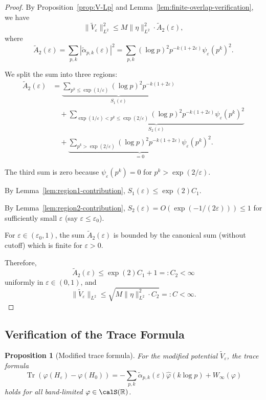 ﻿\documentclass[12pt,a4paper]{article}
\newtheorem{proposition}[theorem]{Proposition}
\theoremstyle{definition}
\theoremstyle{remark}
\newcommand{\RR}{\mathbb{R}}
\newcommand{\Tr}{\operatorname{Tr}}
\begin{document}
\begin{proof}
By Proposition~\ref{prop:V-Lp} and Lemma~\ref{lem:finite-overlap-verification}, we have
\[
  \|\widetilde{V}_\varepsilon\|_{L^2}^2 \leq M \|\eta\|_{L^2}^2 \cdot \widetilde{A}_2(\varepsilon),
\]
where
\[
  \widetilde{A}_2(\varepsilon) = \sum_{p,k} |\widetilde{\alpha}_{p,k}(\varepsilon)|^2 = \sum_{p,k} (\log p)^2 p^{-k(1+2\varepsilon)} \psi_\varepsilon(p^k)^2.
\]

We split the sum into three regions:
\begin{align*}
\widetilde{A}_2(\varepsilon) &= \underbrace{\sum_{p^k \leq \exp(1/\varepsilon)} (\log p)^2 p^{-k(1+2\varepsilon)}}_{S_1(\varepsilon)} \\
&\quad + \underbrace{\sum_{\exp(1/\varepsilon) < p^k \leq \exp(2/\varepsilon)} (\log p)^2 p^{-k(1+2\varepsilon)} \psi_\varepsilon(p^k)^2}_{S_2(\varepsilon)} \\
&\quad + \underbrace{\sum_{p^k > \exp(2/\varepsilon)} (\log p)^2 p^{-k(1+2\varepsilon)} \psi_\varepsilon(p^k)^2}_{=0}.
\end{align*}

The third sum is zero because $\psi_\varepsilon(p^k) = 0$ for $p^k > \exp(2/\varepsilon)$.

By Lemma~\ref{lem:region1-contribution}, $S_1(\varepsilon) \leq \exp(2) C_1$.

By Lemma~\ref{lem:region2-contribution}, $S_2(\varepsilon) = O(\exp(-1/(2\varepsilon))) \leq 1$ for sufficiently small $\varepsilon$ (say $\varepsilon \leq \varepsilon_0$).

For $\varepsilon \in (\varepsilon_0, 1)$, the sum $\widetilde{A}_2(\varepsilon)$ is bounded by the canonical sum (without cutoff) which is finite for $\varepsilon > 0$.

Therefore,
\[
  \widetilde{A}_2(\varepsilon) \leq \exp(2) C_1 + 1 =: C_2 < \infty
\]
uniformly in $\varepsilon \in (0,1)$, and
\[
  \|\widetilde{V}_\varepsilon\|_{L^2} \leq \sqrt{M \|\eta\|_{L^2}^2 \cdot C_2} =: C < \infty.
\]
\end{proof}

\subsection{Verification of the Trace Formula}

\begin{proposition}[Modified trace formula]\label{prop:modified-trace-formula}
For the modified potential $\widetilde{V}_\varepsilon$, the trace formula
\[
  \Tr(\varphi(H_\varepsilon) - \varphi(H_0)) = -\sum_{p,k} \widetilde{\alpha}_{p,k}(\varepsilon) \widehat{\varphi}(k\log p) + W_\infty(\varphi)
\]
holds for all band-limited $\varphi \in \calS(\RR)$.
\end{proposition}
\end{document}
